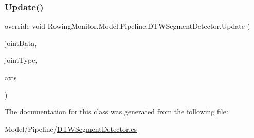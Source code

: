 \subsubsection{\texorpdfstring{Update()}{Update()}}
{\footnotesize\ttfamily override void Rowing\+Monitor.\+Model.\+Pipeline.\+D\+T\+W\+Segment\+Detector.\+Update (\begin{DoxyParamCaption}\item[{\hyperlink{struct_rowing_monitor_1_1_model_1_1_util_1_1_joint_data}{Joint\+Data}}]{joint\+Data,  }\item[{Joint\+Type}]{joint\+Type,  }\item[{string}]{axis }\end{DoxyParamCaption})}



The documentation for this class was generated from the following file\+:\begin{DoxyCompactItemize}
\item 
Model/\+Pipeline/\hyperlink{_d_t_w_segment_detector_8cs}{D\+T\+W\+Segment\+Detector.\+cs}\end{DoxyCompactItemize}
